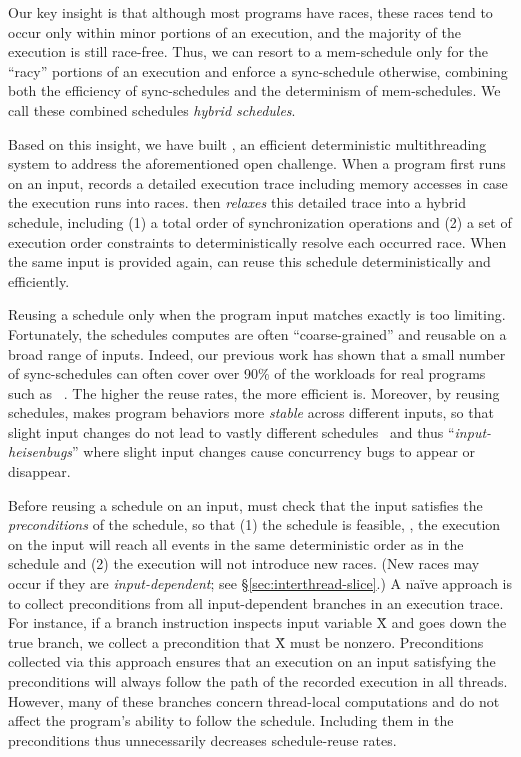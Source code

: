 Our key insight is that although most programs have races, these races
tend to occur only within minor portions of an execution, and the majority
of the execution is still race-free.  Thus, we can resort to a
mem-schedule only for the ``racy'' portions of an execution and enforce a
sync-schedule otherwise, combining both the efficiency of sync-schedules
and the determinism of mem-schedules. We call these combined schedules
\emph{hybrid schedules}.

Based on this insight, we have built \peregrine, an efficient deterministic
multithreading system to address the aforementioned open challenge.
When a program first runs on an input, \peregrine
records a detailed execution trace
including memory accesses in case the execution runs into races.
\peregrine then \emph{relaxes} this detailed trace into a hybrid schedule,
including (1) a total order of synchronization operations and (2) a set of
execution order constraints to
deterministically resolve each occurred race.  When the same input is provided 
again, \peregrine can reuse this schedule deterministically and efficiently.

Reusing a schedule only when the program input matches exactly is too
limiting.  Fortunately, the schedules \peregrine computes are often
``coarse-grained'' and
reusable on a broad range of inputs.  Indeed, our previous work has shown
that a small number of sync-schedules can often cover over 90\% of the
workloads for real programs such as \apache~\cite{cui:tern:osdi10}.  The
higher the reuse rates, the more efficient \peregrine is.  Moreover, by reusing
schedules, \peregrine makes program behaviors more \emph{stable} across
different inputs, so that slight input changes do not lead to vastly
different schedules~\cite{cui:tern:osdi10} and thus ``\emph{input-heisenbugs}''
where slight input changes cause concurrency bugs to appear or disappear.

Before reusing a schedule on an input, \peregrine must check that the input
satisfies the \emph{preconditions} of the schedule, so that (1) the
schedule is feasible, \ie, the execution on the input will reach all
events in the same deterministic order as in the schedule and (2) the
execution will not introduce new races. (New races may occur if they are
\emph{input-dependent}; see \S\ref{sec:interthread-slice}.)  A na\"ive
approach is to collect preconditions from all input-dependent branches in
an execution trace.  For instance, if a branch instruction inspects
input variable \v{X} and goes down the true branch, we collect a
precondition that \v{X} must be nonzero.  Preconditions collected via
this approach ensures that an execution on an input satisfying the
preconditions will always follow the path of the recorded execution in all
threads.  However, many of these branches concern thread-local
computations and do not affect the program's ability to follow the
schedule. Including them in the preconditions thus unnecessarily decreases
schedule-reuse rates.

